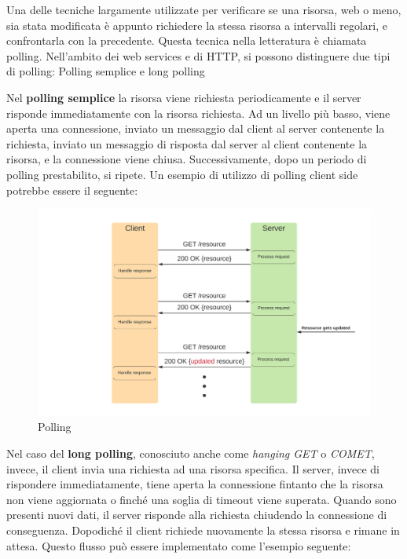 \documentclass[12pt,a4paper,openright,twoside]{report}
\begin{document}
Una delle tecniche largamente utilizzate per verificare se una risorsa, web o meno, sia stata modificata è appunto richiedere la stessa risorsa a intervalli regolari, e confrontarla con la precedente. Questa tecnica nella letteratura è chiamata polling. Nell’ambito dei web services e di HTTP, si possono distinguere due tipi di polling: Polling semplice e long polling
\begin{description}
\item Nel \textbf{polling semplice} la risorsa viene richiesta periodicamente e il server risponde immediatamente con la risorsa richiesta. Ad un livello più basso, viene aperta una connessione, inviato un messaggio dal client al server contenente la richiesta, inviato un messaggio di risposta dal server al client contenente la risorsa, e la connessione viene chiusa. Successivamente, dopo un periodo di polling prestabilito, si ripete.
Un esempio di utilizzo di polling client side potrebbe essere il seguente:


\begin{figure}[htbp]
\centering
\includegraphics[width=.8\textwidth]{assets/polling.png}
\caption{Polling}
\end{figure}

\item Nel caso del \textbf{long polling}, conosciuto anche come \textit{hanging GET} o \textit{COMET}, invece, il client invia una richiesta ad una risorsa specifica. Il server, invece di rispondere immediatamente, tiene aperta la connessione fintanto che la risorsa non viene aggiornata o finché una soglia di timeout viene superata. Quando sono presenti nuovi dati, il server risponde alla richiesta chiudendo la connessione di conseguenza. Dopodiché il client richiede nuovamente la stessa risorsa e rimane in attesa.
Questo flusso può essere implementato come l'esempio seguente:



\end{description}
\end{document}
